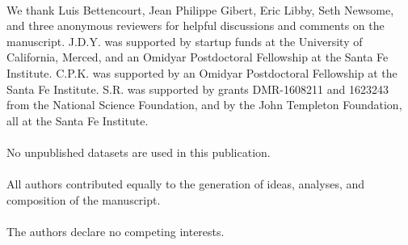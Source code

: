 \documentclass[twocolumn,preprintnumbers,amsmath,amssymb,superscriptaddress]{revtex4}
\begin{document}
\\
We thank Luis Bettencourt, Jean Philippe Gibert, Eric Libby, Seth Newsome, and three anonymous reviewers for helpful
discussions and comments on the manuscript.  J.D.Y. was supported by
startup funds at the University of California, Merced, and an Omidyar
Postdoctoral Fellowship at the Santa Fe Institute.  C.P.K. was supported by
an Omidyar Postdoctoral Fellowship at the Santa Fe Institute.  S.R. was
supported by grants DMR-1608211 and 1623243 from the National Science
Foundation, and by the John Templeton Foundation, all at the Santa Fe
Institute.\\
  
\\
No unpublished datasets are used in this publication.\\

\\
All authors contributed equally to the generation of ideas, analyses, and composition of the manuscript.\\

\\
The authors declare no competing interests.\\

\def\bibfont{\footnotesize}
\renewcommand{\bibsection}{\noindent {\bf References}}







\clearpage

\\
\end{document}
